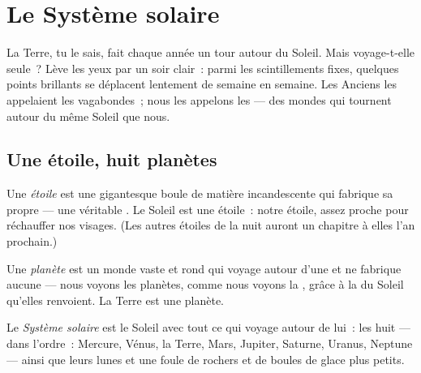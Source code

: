 \chapter{Le Système solaire}\label{ch:g4:solar-system}

La Terre, tu le sais, fait chaque année un tour autour du Soleil.
Mais voyage-t-elle seule~? Lève les yeux par un soir clair~: parmi
les scintillements fixes, quelques points brillants se déplacent
lentement de semaine en semaine. Les Anciens les appelaient les
vagabondes~; nous les appelons les  --- des mondes qui
tournent autour du même Soleil que nous.

\section{Une étoile, huit planètes}

\begin{definition}[Étoile]\label{def:g4:solar-system:star}
Une \emph{étoile} est une gigantesque boule de matière
incandescente qui fabrique sa propre  --- une véritable . Le Soleil est une étoile~: notre étoile, assez proche
pour réchauffer nos visages. (Les autres étoiles de la nuit auront un
chapitre à elles l'an prochain.)
\end{definition}

\begin{definition}[Planète]\label{def:g4:solar-system:planet}
Une \emph{planète} est un monde vaste et rond qui
voyage autour d'une  et ne fabrique aucune  --- nous
voyons les planètes, comme nous voyons la , grâce à la  du
Soleil qu'elles renvoient. La Terre est une planète.
\end{definition}

\begin{definition}\label{def:g4:solar-system:family}
Le \emph{Système solaire} est le Soleil avec
tout ce qui voyage autour de lui~: les huit  --- dans
l'ordre~: Mercure, Vénus, la Terre, Mars, Jupiter, Saturne, Uranus,
Neptune --- ainsi que leurs lunes et une foule de rochers et de
boules de glace plus petits.
\end{definition}

